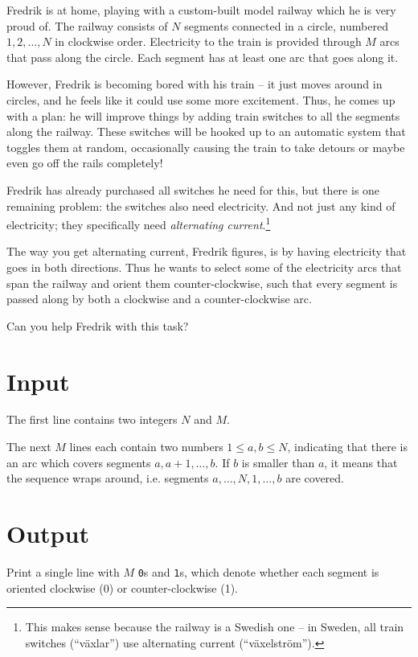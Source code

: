 Fredrik is at home, playing with a custom-built model railway which he is very proud of.
The railway consists of $N$ segments connected in a circle, numbered $1, 2, \dots, N$ in clockwise order.
Electricity to the train is provided through $M$ arcs that pass along the
circle. Each segment has at least one arc that goes along it.

However, Fredrik is becoming bored with his train -- it just moves around in
circles, and he feels like it could use some more excitement.
Thus, he comes up with a plan: he will improve things by adding train switches
to all the segments along the railway. These switches will be hooked up to an
automatic system that toggles them at random, occasionally causing the train to
take detours or maybe even go off the rails completely!

Fredrik has already purchased all switches he need for this, but there is one
remaining problem: the switches also need electricity.
And not just any kind of electricity; they specifically need \emph{alternating current}.\footnote{This makes sense because the railway is a Swedish one -- in Sweden, all train switches (``växlar'') use alternating current (``växelström'').}

The way you get alternating current, Fredrik figures, is by having electricity
that goes in both directions. Thus he wants to select some of the electricity
arcs that span the railway and orient them counter-clockwise, such that every
segment is passed along by both a clockwise and a counter-clockwise arc.

Can you help Fredrik with this task?

\section*{Input}
The first line contains two integers $N$ and $M$.

The next $M$ lines each contain two numbers $1 \le a, b \le N$, indicating that
there is an arc which covers segments $a, a+1, \dots, b$. If $b$ is smaller
than $a$, it means that the sequence wraps around, i.e. segments
$a, \dots, N, 1, \dots, b$ are covered.

\section*{Output}
Print a single line with $M$ \texttt{0}s and \texttt{1}s, which denote whether
each segment is oriented clockwise (0) or counter-clockwise (1).

